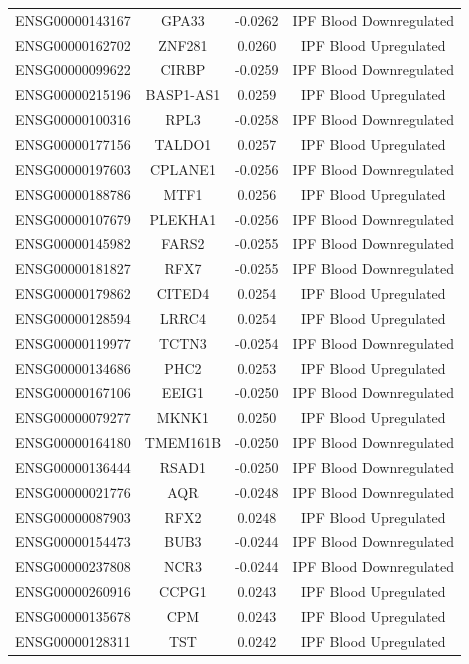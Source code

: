 \documentclass[
]{article}
\begin{document}
\begin{singlespace}
\begin{longtable}[t]{lccc}
ENSG00000143167 & GPA33 & -0.0262 & IPF Blood Downregulated\\
ENSG00000162702 & ZNF281 & 0.0260 & IPF Blood Upregulated\\
ENSG00000099622 & CIRBP & -0.0259 & IPF Blood Downregulated\\
ENSG00000215196 & BASP1-AS1 & 0.0259 & IPF Blood Upregulated\\
\addlinespace
ENSG00000100316 & RPL3 & -0.0258 & IPF Blood Downregulated\\
ENSG00000177156 & TALDO1 & 0.0257 & IPF Blood Upregulated\\
ENSG00000197603 & CPLANE1 & -0.0256 & IPF Blood Downregulated\\
ENSG00000188786 & MTF1 & 0.0256 & IPF Blood Upregulated\\
ENSG00000107679 & PLEKHA1 & -0.0256 & IPF Blood Downregulated\\
\addlinespace
ENSG00000145982 & FARS2 & -0.0255 & IPF Blood Downregulated\\
ENSG00000181827 & RFX7 & -0.0255 & IPF Blood Downregulated\\
ENSG00000179862 & CITED4 & 0.0254 & IPF Blood Upregulated\\
ENSG00000128594 & LRRC4 & 0.0254 & IPF Blood Upregulated\\
ENSG00000119977 & TCTN3 & -0.0254 & IPF Blood Downregulated\\
\addlinespace
ENSG00000134686 & PHC2 & 0.0253 & IPF Blood Upregulated\\
ENSG00000167106 & EEIG1 & -0.0250 & IPF Blood Downregulated\\
ENSG00000079277 & MKNK1 & 0.0250 & IPF Blood Upregulated\\
ENSG00000164180 & TMEM161B & -0.0250 & IPF Blood Downregulated\\
ENSG00000136444 & RSAD1 & -0.0250 & IPF Blood Downregulated\\
\addlinespace
ENSG00000021776 & AQR & -0.0248 & IPF Blood Downregulated\\
ENSG00000087903 & RFX2 & 0.0248 & IPF Blood Upregulated\\
ENSG00000154473 & BUB3 & -0.0244 & IPF Blood Downregulated\\
ENSG00000237808 & NCR3 & -0.0244 & IPF Blood Downregulated\\
ENSG00000260916 & CCPG1 & 0.0243 & IPF Blood Upregulated\\
\addlinespace
ENSG00000135678 & CPM & 0.0243 & IPF Blood Upregulated\\
ENSG00000128311 & TST & 0.0242 & IPF Blood Upregulated\\

\end{longtable}
\end{singlespace}
\end{document}
